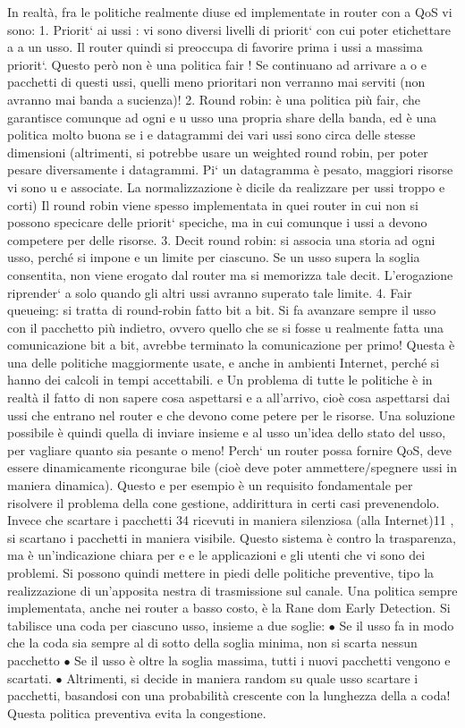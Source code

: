 \documentclass[a4paper,12pt]{article}
\begin{document}
In realtà, fra le politiche realmente diuse ed implementate in router con
a
QoS vi sono:
1. Priorit` ai ussi : vi sono diversi livelli di priorit` con cui poter etichettare
a
a
un usso. Il router quindi si preoccupa di favorire prima i ussi a massima
priorit`. Questo però non è una politica fair ! Se continuano ad arrivare
a
o
e
pacchetti di questi ussi, quelli meno prioritari non verranno mai serviti
(non avranno mai banda a sucienza)!
2. Round robin: è una politica più fair, che garantisce comunque ad ogni
e
u
usso una propria share della banda, ed è una politica molto buona se i
e
datagrammi dei vari ussi sono circa delle stesse dimensioni (altrimenti,
si potrebbe usare un weighted round robin, per poter pesare diversamente
i datagrammi. Pi` un datagramma è pesato, maggiori risorse vi sono
u
e
associate. La normalizzazione è dicile da realizzare per ussi troppo
e
corti) Il round robin viene spesso implementata in quei router in cui non
si possono specicare delle priorit` speciche, ma in cui comunque i ussi
a
devono competere per delle risorse.
3. Decit round robin: si associa una storia ad ogni usso, perché si impone
e
un limite per ciascuno. Se un usso supera la soglia consentita, non viene
erogato dal router ma si memorizza tale decit. L'erogazione riprender`
a
solo quando gli altri ussi avranno superato tale limite.
4. Fair queueing: si tratta di round-robin fatto bit a bit. Si fa avanzare
sempre il usso con il pacchetto più indietro, ovvero quello che se si fosse
u
realmente fatta una comunicazione bit a bit, avrebbe terminato la comunicazione per primo! Questa è una delle politiche
maggiormente usate,
e
anche in ambienti Internet, perché si hanno dei calcoli in tempi accettabili.
e
Un problema di tutte le politiche è in realtà il fatto di non sapere cosa aspettarsi
e
a
all'arrivo, cioè cosa aspettarsi dai ussi che entrano nel router e che devono come
petere per le risorse. Una soluzione possibile è quindi quella di inviare insieme
e
al usso un'idea dello stato del usso, per vagliare quanto sia pesante o meno!
Perch` un router possa fornire QoS, deve essere dinamicamente ricongurae
bile (cioè deve poter ammettere/spegnere ussi in maniera dinamica). Questo
e
per esempio è un requisito fondamentale per risolvere il problema della cone
gestione, addirittura in certi casi prevenendolo. Invece che scartare i pacchetti
34
ricevuti in maniera silenziosa (alla Internet)11 , si scartano i pacchetti in maniera
visibile. Questo sistema è contro la trasparenza, ma è un'indicazione chiara per
e
e
le applicazioni e gli utenti che vi sono dei problemi. Si possono quindi mettere
in piedi delle politiche preventive, tipo la realizzazione di un'apposita nestra di
trasmissione sul canale.
Una politica sempre implementata, anche nei router a basso costo, è la Rane
dom Early Detection. Si tabilisce una coda per ciascuno usso, insieme a due
soglie:
$\bullet$ Se il usso fa in modo che la coda sia sempre al di sotto della soglia
minima, non si scarta nessun pacchetto
$\bullet$ Se il usso è oltre la soglia massima, tutti i nuovi pacchetti vengono
e
scartati.
$\bullet$ Altrimenti, si decide in maniera random su quale usso scartare i pacchetti, basandosi con una probabilità
crescente con la lunghezza della
a
coda!
Questa politica preventiva evita la congestione.
\end{document}
